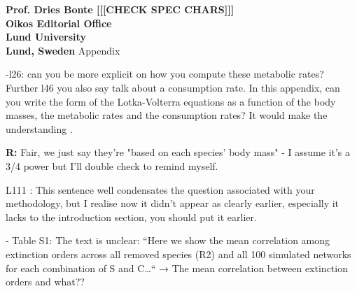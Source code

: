 \documentclass[12pt]{letter}
\begin{document}
\begin{letter}{\bf Prof. Dries Bonte [[[CHECK SPEC CHARS]]]\\
Oikos Editorial Office \\
Lund University \\
Lund, Sweden}
    Appendix

    -l26: can you be more explicit on how you compute these metabolic rates? Further l46 you also say talk about a consumption rate. In this appendix, can you write the form of the Lotka-Volterra equations as a function of the body masses, the metabolic rates and the consumption rates? It would make the understanding .

    \textbf{R:}
    Fair, we just say they're "based on each species' body mass" - I assume it's a 3/4 power but I'll double check to remind myself.

    L111 : This sentence well condensates the question associated with your methodology, but I realise now it didn’t appear as clearly earlier, especially it lacks to the introduction section, you should put it earlier.

    - Table S1: The text is unclear: “Here we show the mean correlation among
    extinction orders across all removed species (R2) and all 100 simulated networks for each combination of S and C…“ → The mean correlation between extinction orders and what??


\end{letter}
\end{document}
